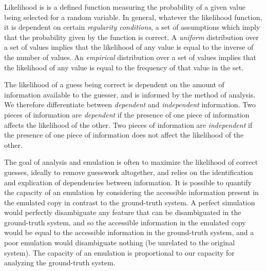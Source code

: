 Likelihood is is a defined function measuring the probability of a given value being selected for a random variable.
In general, whatever the likelihood function, it is dependent on certain \emph{regularity conditions}, a set of assumptions which imply that the probability given by the function is correct.
A \emph{uniform} distribution over a set of values implies that the likelihood of any value is equal to the inverse of the number of values.
An \emph{empirical} distribution over a set of values implies that the likelihood of any value is equal to the frequency of that value in the set.

The likelihood of a guess being correct is dependent on the amount of information available to the guesser, and is informed by the method of analysis.
We therefore differentiate between \emph{dependent} and \emph{independent} information.
Two pieces of information are \emph{dependent} if the presence of one piece of information affects the likelihood of the other.
Two pieces of information are \emph{independent} if the presence of one piece of information does not affect the likelihood of the other.

The goal of analysis and emulation is often to maximize the likelihood of correct guesses, ideally to remove guesswork altogether, and relies on the identification and explication of dependencies between information.
It is possible to quantify the capacity of an emulation by considering the accessible information present in the emulated copy in contrast to the ground-truth system.
A perfect simulation would perfectly disambiguate any feature that can be disambiguated in the ground-truth system, and so the accessible information in the emulated copy would be equal to the accessible information in the ground-truth system, and a poor emulation would disambiguate nothing (be unrelated to the original system).
The capacity of an emulation is proportional to our capacity for analyzing the ground-truth system.
